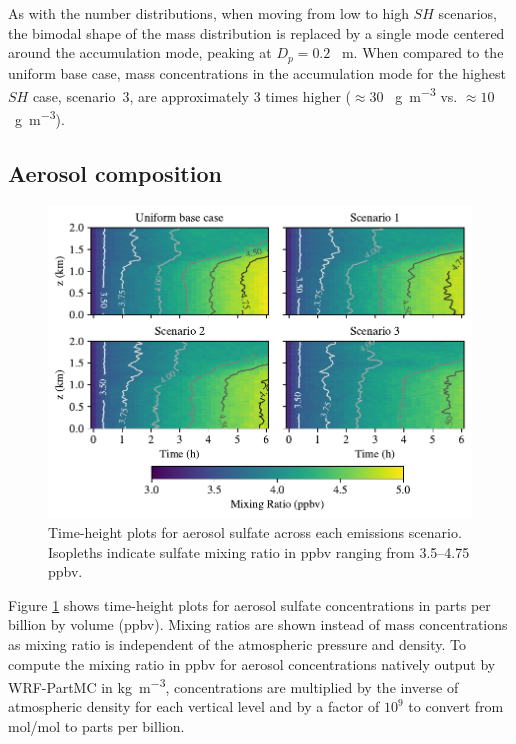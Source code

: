 As with the number distributions, when moving from low to high $SH$ scenarios, the bimodal shape of the mass distribution is replaced by a single mode centered around the accumulation mode, peaking at $D_p = 0.2$ \si{\mu m}. When compared to the uniform base case, mass concentrations in the accumulation mode for the highest $SH$ case, scenario~3, are approximately 3 times higher ($\approx30$ \si{\mu g.m^{-3}} vs. $\approx10$ \si{\mu g.m^{-3}}).


\subsection{Aerosol composition}

\begin{figure}[!t]
  \centering
    \includegraphics[width=\textwidth]{figures/chapter5/height-time-pmc_SO4-four-scenarios.pdf}
    \caption{Time-height plots for aerosol sulfate across each emissions scenario. Isopleths indicate sulfate mixing ratio in ppbv ranging from 3.5--4.75 ppbv.}
    \label{fig:ht-so4}
\end{figure}

Figure \ref{fig:ht-so4} shows time-height plots for aerosol sulfate concentrations in parts per billion by volume (ppbv). Mixing ratios are shown instead of mass concentrations as mixing ratio is independent of the atmospheric pressure and density. To compute the mixing ratio in ppbv for aerosol concentrations natively output by WRF-PartMC in \si{kg.m^{-3}}, concentrations are multiplied by the inverse of atmospheric density for each vertical level and by a factor of $10^9$ to convert from mol/mol to parts per billion.


